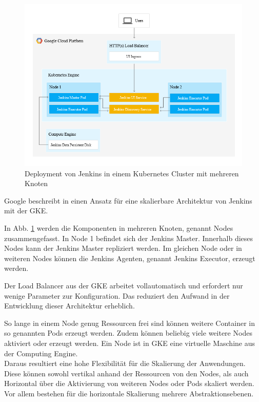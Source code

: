 \begin{figure}[htbp]
 \centering
 \includegraphics[width=1.0\textwidth]{gfx/jenkins-kubernetes-architecture.png}
 \caption{Deployment von Jenkins in einem Kubernetes Cluster mit mehreren Knoten \cite{Google:GKEJenkins}\label{fig:gkejenkins}}
\end{figure}

Google beschreibt in \cite{Google:GKEJenkins} einen Ansatz für eine skalierbare Architektur von Jenkins mit der \ac{GKE}.

In Abb. \ref{fig:gkejenkins} werden die Komponenten in mehreren Knoten, genannt Nodes zusammengefasst. In Node 1 befindet sich der Jenkins Master. Innerhalb dieses Nodes kann der Jenkins Master repliziert werden. Im gleichen Node oder in weiteren Nodes können die Jenkins Agenten, genannt Jenkins Executor, erzeugt werden.

Der Load Balancer aus der \ac{GKE} arbeitet vollautomatisch und erfordert nur wenige Parameter zur Konfiguration. Das reduziert den Aufwand in der Entwicklung dieser Architektur erheblich.

So lange in einem Node genug Ressourcen frei sind können weitere Container in so genannten Pods erzeugt werden. Zudem können beliebig viele weitere Nodes aktiviert oder erzeugt werden. Ein Node ist in \ac{GKE} eine virtuelle Maschine aus der Computing Engine.
\medskip
\\
Daraus resultiert eine hohe Flexibilität für die Skalierung der Anwendungen. Diese können sowohl vertikal anhand der Ressourcen von den Nodes, als auch Horizontal über die Aktivierung von weiteren Nodes oder Pods skaliert werden. Vor allem bestehen für die horizontale Skalierung mehrere Abstraktionsebenen.

